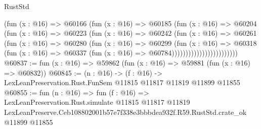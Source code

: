 \begin{lexlean}{RustStd}
\begin{coremodule}
                              (fun (x : @16) =>
                              @60166
                                (fun (x : @16) =>
                                @60185
                                  (fun (x : @16) =>
                                  @60204
                                    (fun (x : @16) =>
                                    @60223
                                      (fun (x : @16) =>
                                      @60242
                                        (fun (x : @16) =>
                                        @60261
                                          (fun (x : @16) =>
                                          @60280
                                            (fun (x : @16) =>
                                            @60299
                                              (fun (x : @16) =>
                                              @60318
                                                (fun (x : @16) =>
                                                @60337
                                                  (fun (x : @16) => @60784))))))))))))))))))))))))
@60837 := fun (x : @16) => @59862 (fun (x : @16) => @59881 (fun (x : @16) => @60832))
@60845 := (n : @16) ->
  (f : @16) -> LexLeanPreservation.Rust.FunSem @11815 @11817 @11819 @11899 @11855
@60855 := fun (n : @16) =>
  fun (f : @16) =>
  LexLeanPreservation.Rust.simulate
    @11815
    @11817
    @11819
    LexLeanPreserve.Ceb108802001b57e7f338e3bbbdea932f.R59.RustStd.crate_ok
    @11899
    @11855
\end{coremodule}
\end{lexlean}
